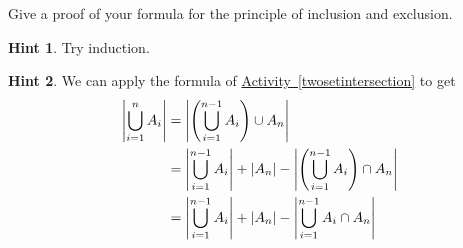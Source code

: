 \documentclass{book}
\begin{document}
\setcounter{cpjt}{223}
\addtocounter{cpjt}{-1}
\begin{activity}\label{activity-216}
\hypertarget{p-1198}{}%
Give a proof of your formula for the principle of inclusion and exclusion.%
\par\smallskip%
\noindent\textbf{Hint 1}.\hypertarget{hint-143}{}\quad%
\hypertarget{p-1199}{}%
Try induction.%
\par\smallskip%
\noindent\textbf{Hint 2}.\hypertarget{hint-144}{}\quad%
\hypertarget{p-1200}{}%
We can apply the formula of \hyperref[twosetintersection]{Activity~\ref{twosetintersection}} to get%
\begin{align*}
\left|\bigcup_{i=1}^n A_i \right| & = \left|\left(\bigcup_{i=1}^{n-1} A_i\right) \cup A_n \right| \\
& = \left| \bigcup_{i=1}^{n-1} A_i\right| + |A_n| - \left|\left( \bigcup_{i=1}^{n-1} A_i\right) \cap A_n\right|\\
& = \left| \bigcup_{i=1}^{n-1} A_i\right| + |A_n| - \left|\bigcup_{i=1}^{n-1} A_i \cap A_n\right|
\end{align*}
%
\par\smallskip%
\noindent\end{activity}

\clearpage
\end{document}
